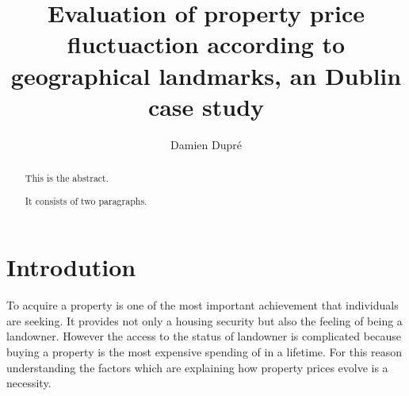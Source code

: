 \documentclass[]{elsarticle} %
\begin{document}
\begin{frontmatter}

  \title{Evaluation of property price fluctuaction according to geographical
landmarks, an Dublin case study}
    \author[Dublin City University]{Damien Dupré}
      \address[Dublin City University]{Business School, Glasnevin, Dublin 9, Ireland}
  
  \begin{abstract}
  This is the abstract.
  
  It consists of two paragraphs.
  \end{abstract}
  
 \end{frontmatter}

\section{Introdution}\label{introdution}

To acquire a property is one of the most important achievement that
individuals are seeking. It provides not only a housing security but
also the feeling of being a landowner. However the access to the status
of landowner is complicated because buying a property is the most
expensive spending of in a lifetime. For this reason understanding the
factors which are explaining how property prices evolve is a necessity.
\end{document}
